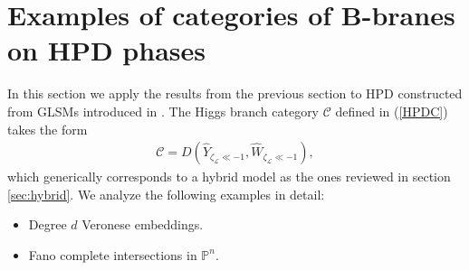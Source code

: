 \documentclass[a4paper,11pt]{article}
\numberwithin{equation}{section}
\begin{document}



\section{\label{sec:examples}Examples of categories of B-branes on HPD 
phases}

In this section we apply the results from the previous section to HPD 
constructed from GLSMs introduced in \cite{Chen:2020iyo}. The Higgs branch 
category 
$\mathcal{C}$ defined in (\ref{HPDC}) takes the form
\begin{eqnarray}
\mathcal{C}=D(\widehat{Y}_{\zeta_{\mathcal{L}}\ll 
-1},\widehat{W}_{\zeta_{\mathcal{L}}\ll 
-1}),
\end{eqnarray} 
which generically corresponds to a hybrid model as the ones reviewed in 
section \ref{sec:hybrid}. We 
 analyze the following examples in detail:
\begin{itemize}
 \item  Degree $d$ Veronese embeddings.
\item Fano complete intersections in $\mathbb{P}^{n}$.
\end{itemize}
\end{document}
